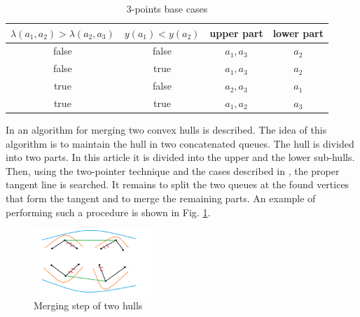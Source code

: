 \documentclass[conference]{IEEEtran}
\theoremstyle{plane}
\begin{document}
		\begin{table}[htbp]
			\caption{3-points base cases}
			\label{table:3points}
			\begin{center}
				\begin{tabular}{|c|c|c|c|}
					\hline
					\textbf{$\lambda(a_1, a_2) > \lambda(a_2, a_3)$} & \textbf{$y(a_1) < y(a_2)$} & upper part & lower part\\
					\hline
					false & false & $a_1, a_3$ & $a_2$ \\
					\hline
					false & true & $a_1, a_3$ & $a_2$ \\
					\hline
					true & false & $a_2, a_3$ & $a_1$ \\
					\hline
					true & true & $a_1, a_2$ & $a_3$ \\
					\hline
				\end{tabular} 
			\end{center}
		\end{table} 
	

		In \cite{overmars} an algorithm for merging two convex hulls is described. The idea of this algorithm is to maintain the hull in two concatenated queues. The hull is divided into two parts. In this article it is divided into the upper and the lower sub-hulls. Then, using the two-pointer technique and the cases described in \cite{overmars}, the proper tangent line is searched. It remains to split the two queues at the found vertices that form the tangent and to merge the remaining parts. An example of performing such a procedure is shown in Fig. \ref{fig:ch_union}.
		
		\begin{figure}[htbp]
			\centerline{\includegraphics[width=0.4\textwidth, height=0.2\textheight]{ch_union}}
			\caption{Merging step of two hulls}
			\label{fig:ch_union}
		\end{figure}
		
\end{document}
